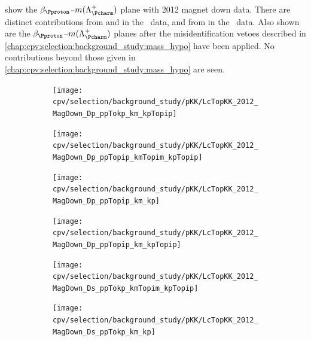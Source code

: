 show the $\beta_{\Pproton}$--$m(\PLambdac)$ plane with 2012 magnet down data.
There are distinct contributions from \decay{\PDplus}{\PKplus\PKminus\Ppiplus} 
and \decay{\PDsplus}{\PKplus\PKminus\Ppiplus} in the \pKK\ data, and from 
\decay{\PDsplus}{\PKplus\Ppiminus\Ppiplus} in the \ppipi\ data.
Also shown are the $\beta_{\Pproton}$--$m(\PLambdac)$ planes after the 
misidentification vetoes described in 
\cref{chap:cpv:selection:background_study:mass_hypo} have been applied.
No contributions beyond those given in 
\cref{chap:cpv:selection:background_study:mass_hypo} are seen.

\begin{figure}
  \begin{subfigure}[b]{0.3\textwidth}
    \texttt{[image: cpv/selection/background\_study/pKK/LcTopKK\_2012\_MagDown\_Dp\_ppTokp\_km\_kpTopip]}
    \caption{\decay{\PDplus}{\PKplus\PKminus\Ppiplus}}
    \label{fig:cpv:selection:background_study:pKK_meson:dplus_kkpi}
  \end{subfigure}
  \begin{subfigure}[b]{0.3\textwidth}
    \texttt{[image: cpv/selection/background\_study/pKK/LcTopKK\_2012\_MagDown\_Dp\_ppTopip\_kmTopim\_kpTopip]}
    \caption{\decay{\PDplus}{\Ppiplus\Ppiminus\Ppiplus}}
    \label{fig:cpv:selection:background_study:pKK_meson:dplus_pipipi}
  \end{subfigure}
  \begin{subfigure}[b]{0.3\textwidth}
    \texttt{[image: cpv/selection/background\_study/pKK/LcTopKK\_2012\_MagDown\_Dp\_ppTopip\_km\_kp]}
    \caption{\decay{\PDplus}{\Ppiplus\PKminus\PKplus}}
    \label{fig:cpv:selection:background_study:pKK_meson:dplus_pikk}
  \end{subfigure}

  \begin{subfigure}[b]{0.3\textwidth}
    \texttt{[image: cpv/selection/background\_study/pKK/LcTopKK\_2012\_MagDown\_Dp\_ppTopip\_km\_kpTopip]}
    \caption{\decay{\PDplus}{\Ppiplus\PKminus\Ppiplus}}
    \label{fig:cpv:selection:background_study:pKK_meson:dplus_pikpi}
  \end{subfigure}
  \begin{subfigure}[b]{0.3\textwidth}
    \texttt{[image: cpv/selection/background\_study/pKK/LcTopKK\_2012\_MagDown\_Ds\_ppTokp\_kmTopim\_kpTopip]}
    \caption{\decay{\PDsplus}{\PKplus\Ppiminus\Ppiplus}}
    \label{fig:cpv:selection:background_study:pKK_meson:dsplus_Kpipi}
  \end{subfigure}
  \begin{subfigure}[b]{0.3\textwidth}
    \texttt{[image: cpv/selection/background\_study/pKK/LcTopKK\_2012\_MagDown\_Ds\_ppTokp\_km\_kp]}
    \caption{\decay{\PDsplus}{\PKplus\PKminus\PKplus}}
    \label{fig:cpv:selection:background_study:pKK_meson:dsplus_KKK}
  \end{subfigure}


\end{figure}
